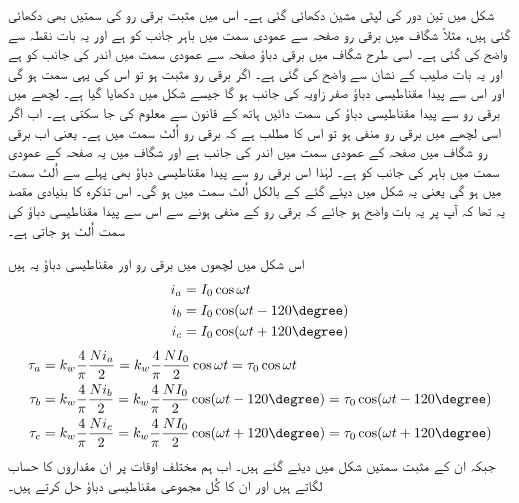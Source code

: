 شکل   میں تین دور کی لپٹی مشین دکھائی گئی ہے۔ اس میں مثبت برقی رو کی سمتیں بھی دکھائی گئی ہیں، مثلاً  شگاف میں برقی رو صفحہ سے عمودی سمت میں باہر جانب کو ہے اور یہ بات نقطہ سے واضح کی گئی ہے۔ اسی طرح  شگاف میں برقی دباؤ صفحہ سے عمودی سمت میں اندر کی جانب کو ہے اور یہ بات صلیب کے نشان سے واضح کی گئی ہے۔ اگر برقی رو مثبت ہو تو اس کی یہی سمت ہو گی اور اس سے پیدا مقناطیسی دباؤ  صفر زاویہ کی جانب ہو گا جیسے شکل میں دکھایا گیا ہے۔ لچھے میں برقی رو سے پیدا مقناطیسی دباؤ کی سمت دائیں ہاتھ کے قانون سے معلوم کی جا سکتی ہے۔ اب اگر اسی لچھے میں برقی رو منفی ہو تو اس کا مطلب ہے کہ برقی رو اُلٹ سمت میں ہے۔ یعنی اب برقی رو  شگاف میں صفحہ کے عمودی سمت میں اندر کی جانب ہے اور  شگاف میں یہ صفحہ کے عمودی سمت میں باہر کی جانب کو ہے۔ لہٰذا اس برقی رو سے پیدا مقناطیسی دباؤ بھی پہلے سے اُلٹ سمت میں ہو گی یعنی یہ شکل میں دیئے گئے    کے بالکل اُلٹ سمت میں ہو گی۔ اس تذکرہ کا بنیادی مقصد یہ تھا کہ آپ پر یہ بات واضح ہو جائے کہ برقی رو کے منفی ہونے سے اس سے پیدا مقناطیسی دباؤ کی سمت اُلٹ ہو جاتی ہے۔

اس شکل میں لچھوں میں برقی رو اور مقناطیسی دباؤ یہ ہیں
\begin{gather}
\begin{aligned}
i_a&=I_0 \cos \omega t\\
i_b&=I_0 \cos (\omega t-120\degree)\\
i_c&=I_0 \cos (\omega t+120\degree)
\end{aligned}
\end{gather}
%
\begin{gather}
\begin{aligned}
\tau_a&=k_w \frac{4}{\pi}\frac{N i_a}{2}=k_w \frac{4}{\pi}\frac{N I_0}{2} \cos \omega t=\tau_0 \cos \omega t\\
\tau_b&=k_w \frac{4}{\pi}\frac{N i_b}{2}=k_w \frac{4}{\pi}\frac{N I_0}{2} \cos (\omega t-120\degree)=\tau_0 \cos (\omega t-120\degree)\\
\tau_c&=k_w \frac{4}{\pi}\frac{N i_c}{2}=k_w \frac{4}{\pi}\frac{N I_0}{2} \cos (\omega t+120\degree)=\tau_0 \cos (\omega t+120\degree)
\end{aligned}
\end{gather}
جبکہ ان کے مثبت سمتیں شکل میں دیئے گئے ہیں۔ اب ہم مختلف اوقات پر ان مقداروں کا حساب لگاتے ہیں اور ان کا کُل مجموعی مقناطیسی دباؤ حل کرتے ہیں۔

